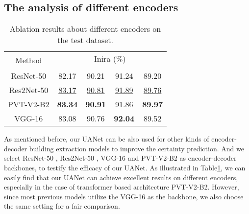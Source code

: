 \documentclass[lettersize,journal]{IEEEtran}
\begin{document}
\subsection{The analysis of different encoders}
\begin{table}[]
\normalsize
\setlength\tabcolsep{3pt}
\caption{Ablation results about different encoders on the test dataset.}
\label{tab:table_Encoder}
\center
\begin{tabular}{c|cccc}
\hline
\multirow{2}{*}{Method} &\multicolumn{4}{c}{Inira (\%)}                                             
 \\ \cline{2-5} 
 &  &  &  &  \\ \hline
ResNet-50&
82.17 &90.21 &91.24 &89.20\\
Res2Net-50&
\underline{83.17} &\underline{90.81} &\underline{91.89} &\underline{89.76}\\ 
PVT-V2-B2 &
\color{red}\textbf{83.34} &\color{red}\textbf{90.91} &91.86 &\color{red}\textbf{89.97}\\ 
VGG-16 &
{83.08}  &{90.76} &\color{red}\textbf{92.04} &{89.52}
\\ \hline
\end{tabular}
\end{table}
As mentioned before, our UANet can be also used for other kinds of encoder-decoder building extraction models to improve the certainty prediction. And we select ResNet-50 \cite{ResNet}, Res2Net-50 \cite{Res2Net}, VGG-16 \cite{VGG} and PVT-V2-B2 \cite{PVT} as encoder-decoder backbones, to testify the efficacy of our UANet. As illustrated in Table\ref{tab:table_Encoder}, we can easily find that our UANet can achieve excellent results on different encoders, especially in the case of transformer based architecture PVT-V2-B2. However, since most previous models utilize the VGG-16 as the backbone, we also choose the same setting for a fair comparison.
\end{document}
